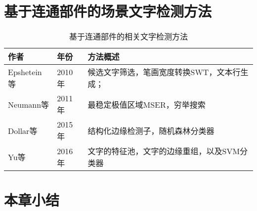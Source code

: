     \section{基于连通部件的场景文字检测方法}

    \begin{table*}[!h]
    \centering
    \caption{基于连通部件的相关文字检测方法}
    \begin{tabular}{p{}|p{}| p{}}
    \hline
    作者 & 年份 & 方法概述 \\
    \hline
    Epshetein等\cite{Epshtein2010Detecting} & 2010年 & 候选文字筛选，笔画宽度转换SWT，文本行生成；\\
    Neumann等\cite{Neumann2011Text} & 2011年 &   最稳定极值区域MSER，穷举搜索\\
    Dollar等\cite{Dollar2015Fast} & 2015年 & 结构化边缘检测子，随机森林分类器 \\
    Yu等\cite{Yu2016Scene} & 2016年 & 文字的特征池，文字的边缘重组，以及SVM分类器 \\
    \hline
    \end{tabular}
    \label{tab.c2_connected_component_based}
    \end{table*}

    \section{本章小结}

